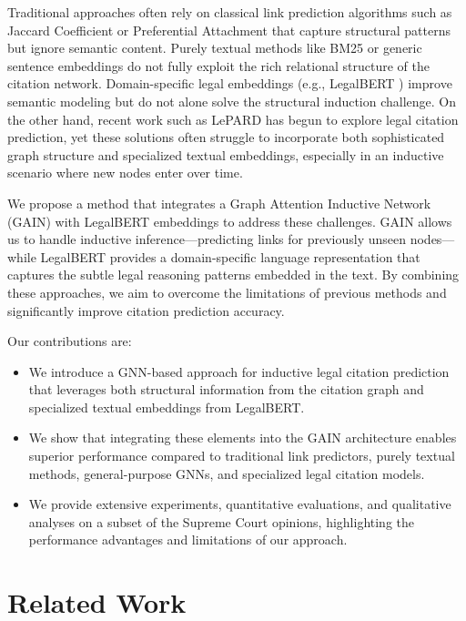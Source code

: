 \documentclass{article}
\begin{document}
Traditional approaches often rely on classical link prediction algorithms such as Jaccard Coefficient or Preferential Attachment \citep{liben2007link} that capture structural patterns but ignore semantic content. Purely textual methods like BM25 \citep{robertson2009probabilistic} or generic sentence embeddings \citep{reimers2019sentence} do not fully exploit the rich relational structure of the citation network. Domain-specific legal embeddings (e.g., LegalBERT \citep{chalkidis-etal-2020-legalbert}) improve semantic modeling but do not alone solve the structural induction challenge. On the other hand, recent work such as LePARD \citep{mahari2022lepard} has begun to explore legal citation prediction, yet these solutions often struggle to incorporate both sophisticated graph structure and specialized textual embeddings, especially in an inductive scenario where new nodes enter over time.

We propose a method that integrates a Graph Attention Inductive Network (GAIN) \citep{weng2022gain} with LegalBERT embeddings to address these challenges. GAIN allows us to handle inductive inference—predicting links for previously unseen nodes—while LegalBERT provides a domain-specific language representation that captures the subtle legal reasoning patterns embedded in the text. By combining these approaches, we aim to overcome the limitations of previous methods and significantly improve citation prediction accuracy.

Our contributions are:
\begin{itemize}[leftmargin=*]
    \item We introduce a GNN-based approach for inductive legal citation prediction that leverages both structural information from the citation graph and specialized textual embeddings from LegalBERT.
    \item We show that integrating these elements into the GAIN architecture enables superior performance compared to traditional link predictors, purely textual methods, general-purpose GNNs, and specialized legal citation models.
    \item We provide extensive experiments, quantitative evaluations, and qualitative analyses on a subset of the Supreme Court opinions, highlighting the performance advantages and limitations of our approach.
\end{itemize}

\section{Related Work}
\end{document}
